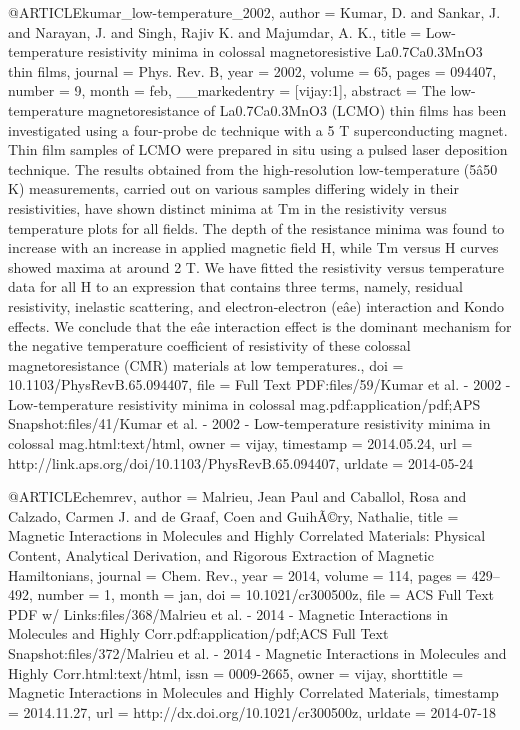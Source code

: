 @ARTICLE{kumar_low-temperature_2002,
  author = {Kumar, D. and Sankar, J. and Narayan, J. and Singh, Rajiv K. and
	Majumdar, A. K.},
  title = {Low-temperature resistivity minima in colossal magnetoresistive {La0.7Ca0.3MnO3}
	thin films},
  journal = {Phys. Rev. B},
  year = {2002},
  volume = {65},
  pages = {094407},
  number = {9},
  month = feb,
  __markedentry = {[vijay:1]},
  abstract = {The low-temperature magnetoresistance of {La0.7Ca0.3MnO3} ({LCMO)}
	thin films has been investigated using a four-probe dc technique
	with a 5 T superconducting magnet. Thin film samples of {LCMO} were
	prepared in situ using a pulsed laser deposition technique. The results
	obtained from the high-resolution low-temperature (5â50 K) measurements,
	carried out on various samples differing widely in their resistivities,
	have shown distinct minima at Tm in the resistivity versus temperature
	plots for all fields. The depth of the resistance minima was found
	to increase with an increase in applied magnetic field H, while Tm
	versus H curves showed maxima at around 2 T. We have fitted the resistivity
	versus temperature data for all H to an expression that contains
	three terms, namely, residual resistivity, inelastic scattering,
	and electron-electron (eâe) interaction and Kondo effects. We conclude
	that the eâe interaction effect is the dominant mechanism for the
	negative temperature coefficient of resistivity of these colossal
	magnetoresistance ({CMR)} materials at low temperatures.},
  doi = {10.1103/PhysRevB.65.094407},
  file = {Full Text PDF:files/59/Kumar et al. - 2002 - Low-temperature resistivity minima in colossal mag.pdf:application/pdf;APS Snapshot:files/41/Kumar et al. - 2002 - Low-temperature resistivity minima in colossal mag.html:text/html},
  owner = {vijay},
  timestamp = {2014.05.24},
  url = {http://link.aps.org/doi/10.1103/PhysRevB.65.094407},
  urldate = {2014-05-24}
}

@ARTICLE{chemrev,
  author = {Malrieu, Jean Paul and Caballol, Rosa and Calzado, Carmen J. and
	de Graaf, Coen and GuihÃ©ry, Nathalie},
  title = {Magnetic Interactions in Molecules and Highly Correlated Materials:
	Physical Content, Analytical Derivation, and Rigorous Extraction
	of Magnetic Hamiltonians},
  journal = {Chem. Rev.},
  year = {2014},
  volume = {114},
  pages = {429--492},
  number = {1},
  month = jan,
  doi = {10.1021/cr300500z},
  file = {ACS Full Text PDF w/ Links:files/368/Malrieu et al. - 2014 - Magnetic Interactions in Molecules and Highly Corr.pdf:application/pdf;ACS Full Text Snapshot:files/372/Malrieu et al. - 2014 - Magnetic Interactions in Molecules and Highly Corr.html:text/html},
  issn = {0009-2665},
  owner = {vijay},
  shorttitle = {Magnetic Interactions in Molecules and Highly Correlated Materials},
  timestamp = {2014.11.27},
  url = {http://dx.doi.org/10.1021/cr300500z},
  urldate = {2014-07-18}
}


